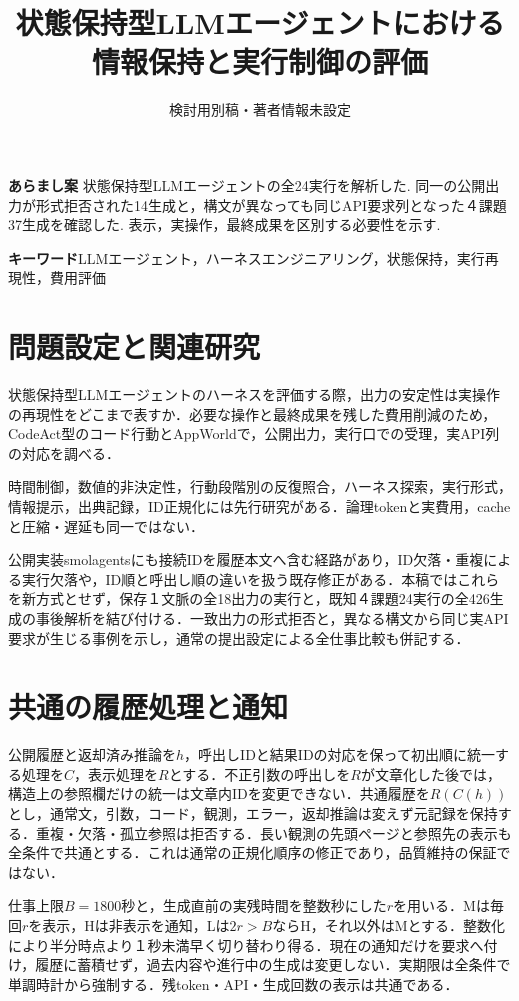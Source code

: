 \documentclass[uplatex,a4paper,twocolumn,10pt]{jsarticle}
\title{状態保持型LLMエージェントにおける\newline 情報保持と実行制御の評価}
\author{検討用別稿・著者情報未設定}
\date{}
\begin{document}
\raggedbottom
\maketitle
\noindent\textbf{あらまし案}\quad
状態保持型LLMエージェントの全24実行を解析した. 同一の公開出力が形式拒否された14生成と，構文が異なっても同じAPI要求列となった４課題37生成を確認した. 表示，実操作，最終成果を区別する必要性を示す.

\noindent\textbf{キーワード}\quad LLMエージェント，ハーネスエンジニアリング，状態保持，実行再現性，費用評価

\section{問題設定と関連研究}
状態保持型LLMエージェントのハーネスを評価する際，出力の安定性は実操作の再現性をどこまで表すか．必要な操作と最終成果を残した費用削減のため，CodeAct\cite{codeact}型のコード行動とAppWorld\cite{appworld}で，公開出力，実行口での受理，実API列の対応を調べる．

時間制御\cite{clock,timely}，数値的非決定性\cite{nondeterminism}，行動段階別の反復照合\cite{consistency}，ハーネス探索\cite{beyondprompts}，実行形式\cite{localprotocol}，情報提示\cite{delivery}，出典記録\cite{repro}，ID正規化\cite{canonical}には先行研究がある．論理tokenと実費用\cite{costproxy}，cacheと圧縮・遅延\cite{capc,cacheeval}も同一ではない．

公開実装smolagentsにも接続IDを履歴本文へ含む経路があり\cite{smolmemory}，ID欠落・重複による実行欠落や，ID順と呼出し順の違いを扱う既存修正がある\cite{smolids}．本稿ではこれらを新方式とせず，保存１文脈の全18出力の実行と，既知４課題24実行の全426生成の事後解析を結び付ける．一致出力の形式拒否と，異なる構文から同じ実API要求が生じる事例を示し，通常の提出設定による全仕事比較も併記する．

\section{共通の履歴処理と通知}
公開履歴と返却済み推論を$h$，呼出しIDと結果IDの対応を保って初出順に統一する処理を$C$，表示処理を$R$とする．不正引数の呼出しを$R$が文章化した後では，構造上の参照欄だけの統一は文章内IDを変更できない．共通履歴を$R(C(h))$とし，通常文，引数，コード，観測，エラー，返却推論は変えず元記録を保持する．重複・欠落・孤立参照は拒否する．長い観測の先頭ページと参照先の表示も全条件で共通とする．これは通常の正規化順序の修正であり，品質維持の保証ではない．

仕事上限$B=1800$秒と，生成直前の実残時間を整数秒にした$r$を用いる．Mは毎回$r$を表示，Hは非表示を通知，Lは$2r>B$ならH，それ以外はMとする．整数化により半分時点より１秒未満早く切り替わり得る．現在の通知だけを要求へ付け，履歴に蓄積せず，過去内容や進行中の生成は変更しない．実期限は全条件で単調時計から強制する．残token・API・生成回数の表示は共通である．
\end{document}
